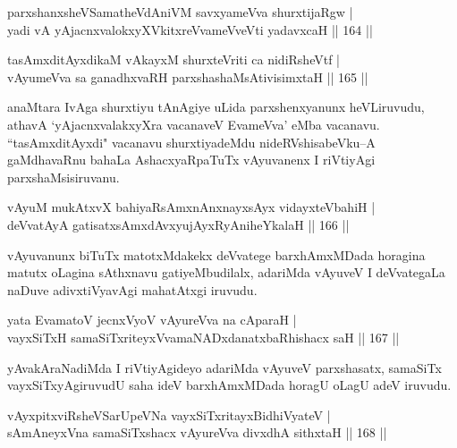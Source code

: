 \begin{shl}
parxshanxsheVSamatheVdAniVM savxyameVva shurxtijaRgw |\\
yadi vA yAjacnxvalokxyXVkitxreVvameVveVti yadavxcaH \hfill || 164 ||
\end{shl}

\begin{shl}
tasAmxditAyxdikaM vAkayxM shurxteVriti ca nidiRsheVtf |\\
vAyumeVva sa ganadhxvaRH parxshashaMsAtivisimxtaH \hfill || 165 ||
\end{shl}

\begin{artha}
anaMtara IvAga shurxtiyu tAnAgiye uLida parxshenxyanunx heVLiruvudu, athavA `yAjacnxvalakxyXra vacanaveV EvameVva' eMba vacanavu. ``tasAmxditAyxdi" vacanavu shurxtiyadeMdu nideRVshisabeVku--A gaMdhavaRnu bahaLa AshacxyaRpaTuTx vAyuvanenx I riVtiyAgi parxshaMsisiruvanu.
\end{artha}


\begin{shl}
vAyuM mukAtxvX bahiyaRsAmxnAnxnayxsAyx vidayxteVbahiH |\\
deVvatAyA gatisatxsAmxdAvxyujAyxRyAniheYkalaH \hfill || 166 ||
\end{shl}

\begin{artha}
vAyuvanunx biTuTx matotxMdakekx deVvatege barxhAmxMDada horagina matutx oLagina sAthxnavu gatiyeMbudilalx, adariMda vAyuveV I deVvategaLa naDuve adivxtiVyavAgi mahatAtxgi iruvudu.
\end{artha}

\begin{shl}
yata EvamatoV jecnxVyoV vAyureVva na cAparaH |\\
vayxSiTxH samaSiTxriteyxVvamaNADxdanatxbaRhishacx saH \hfill || 167 ||
\end{shl}

\begin{artha}
yAvakAraNadiMda I riVtiyAgideyo adariMda vAyuveV parxshasatx, samaSiTx vayxSiTxyAgiruvudU saha ideV barxhAmxMDada horagU oLagU adeV iruvudu.
\end{artha}


\begin{shl}
vAyxpitxviRsheVSarUpeVNa vayxSiTxritayxBidhiVyateV |\\
sAmAneyxVna samaSiTxshacx vAyureVva divxdhA sithxtaH \hfill || 168 ||
\end{shl}

